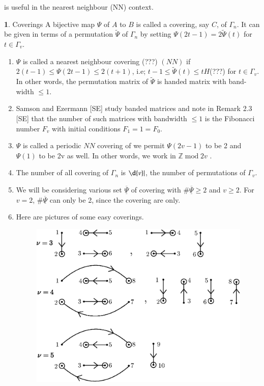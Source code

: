 \documentclass[a4paper,12pt]{article}
\DeclareMathOperator{\md}{\mathrm{mod}}
\theoremstyle{definition}
\theoremstyle{underlinethm}
\theoremstyle{definition}
\newtheorem{subsubsec}{}[subsection]
\begin{document}
is useful in the nearest neighbour (NN) context.

\begin{subsubsec}\label{subsubsection-3.1.1}
Coverings A bijective map $\Psi$ of $A$ to $B$ is called a covering, say $C$, of $\Gamma_{n}$. It can be given in terms of a permutation $\widetilde{\Psi}$ of $\Gamma_{n}$ by setting $\Psi(2t-1) = 2\widetilde{\Psi}(t)$ for $t \in \Gamma_{v}$.
  \begin{enumerate}[label=(\alph*)]
  \item $\Psi$ is called a nearest neighbour covering (???) $(NN)$ if $2(t-1) \leq \Psi(2t-1) \leq 2(t+1)$, i.e; $t-1 \leq \widetilde{\Psi}(t) \leq t H$(???) for $t \in \Gamma_{v}$. In other words, the permutation matrix of $\widetilde{\Psi}$ is handed matrix with band-width $\leq 1$.
   \item Samson and Ezermann [SE] study banded matrices and note in Remark 2.3 [SE] that the number of such matrices with bandwidth $\leq 1$ is the Fibonacci number $F_{v}$ with initial conditions $F_{1}=1 =F_{0}$.
   \item $\Psi$ is called a periodic $NN$ covering of we permit $\Psi(2v-1)$ to be 2 and $\Psi(1)$ to be 2v as well. In other words, we work in $\mathbb{Z} \md 2v$ .
   \item The number of all covering of $\Gamma_{n}$ is $\d{v}|$, the number of permutations of $\Gamma_{v}$.
    \item We will be considering various set $\underline{\overline\Psi}$ of covering with $\#\underline{\overline\Psi} \geq 2$ and $v \geq 2$. For $v=2$, $\#\underline{\overline\Psi}$ can only be 2, since the covering are only.
    
    \newpage
    
    \item Here are pictures of some easy coverings.
    
    \begin{figure}[h]
\centering
\includegraphics[scale=.8]{figure/fig3.1.eps}
\caption{}\label{fig03}
\end{figure}

  \end{enumerate}
\end{subsubsec}
\end{document}
